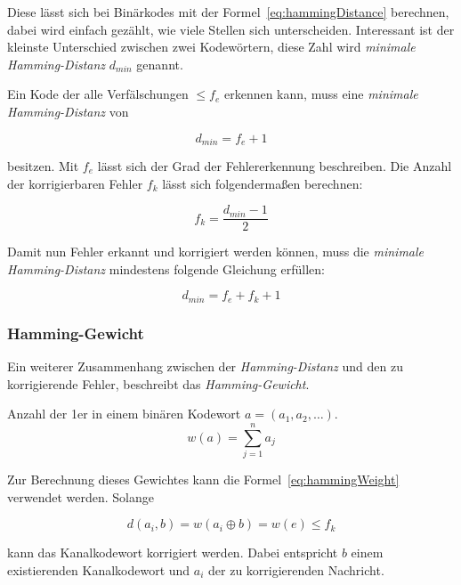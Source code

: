 Diese lässt sich bei Binärkodes mit der Formel~\ref{eq:hammingDistance} berechnen, dabei wird einfach gezählt, wie viele Stellen sich unterscheiden. Interessant ist der kleinste Unterschied zwischen zwei Kodewörtern, diese Zahl wird \emph{minimale Hamming-Distanz} $d_{min}$ genannt.

Ein Kode der alle Verfälschungen $\leq f_e$ erkennen kann, muss eine \emph{minimale Hamming-Distanz} von 

\begin{equation}
d_{min} = f_e + 1
\end{equation}

besitzen. Mit $f_e$ lässt sich der Grad der Fehlererkennung beschreiben. Die Anzahl der korrigierbaren Fehler $f_k$ lässt sich folgendermaßen berechnen:

\begin{equation}
f_k = \frac{d_{min}-1}{2}
\end{equation}

Damit nun Fehler erkannt und korrigiert werden können, muss die \emph{minimale Hamming-Distanz} mindestens folgende Gleichung erfüllen:~\cite[S.~132~f.]{schoenfeld2012informations}

\begin{equation}
d_{min} = f_e + f_k + 1
\end{equation} 

\subsubsection{Hamming-Gewicht}
\label{sec:hammingWeight}
Ein weiterer Zusammenhang zwischen der \emph{Hamming-Distanz} und den zu korrigierende Fehler, beschreibt das \emph{Hamming-Gewicht}.

\begin{t_def}
Anzahl der 1er in einem binären Kodewort $a=(a_1,a_2,\dotsc)$.
\begin{equation}
w(a) = \sum^n_{j=1} a_j
\label{eq:hammingWeight}
\end{equation} 
\end{t_def} 

Zur Berechnung dieses Gewichtes kann die Formel~\ref{eq:hammingWeight} verwendet werden. Solange 

\begin{equation}
d(a_i,b)=w(a_i \oplus b) = w(e) \leq f_k
\end{equation} 

kann das Kanalkodewort korrigiert werden. Dabei entspricht $b$ einem existierenden Kanalkodewort und $a_i$ der zu korrigierenden Nachricht.~\cite[134]{schoenfeld2012informations}
